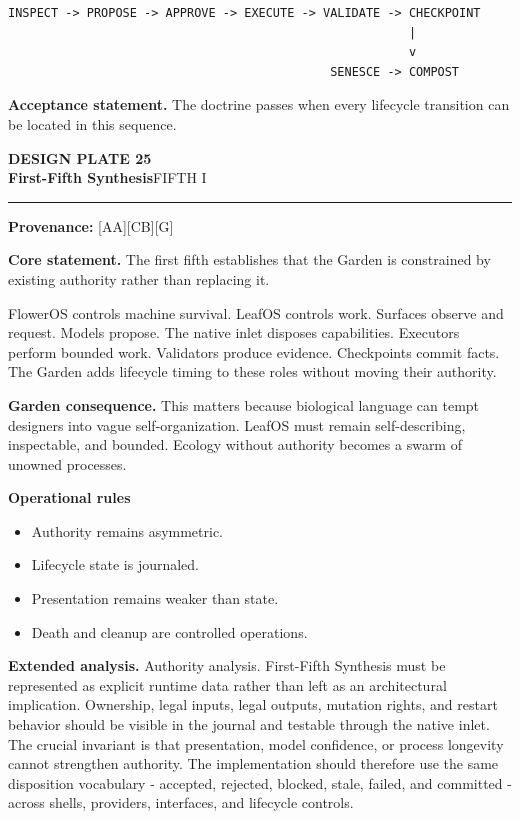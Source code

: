\documentclass[10pt,letterpaper,oneside]{article}
\newcommand{\prov}[1]{\textcolor{gardenBlue}{\sffamily\footnotesize\textbf{Provenance:} #1}}
\newcommand{\platetitle}[3]{%
  \begin{minipage}[t][0.54in][t]{\textwidth}
  {\sffamily\bfseries\color{gardenDeep}\fontsize{9}{10}\selectfont DESIGN PLATE #1}\\[-1pt]
  {\sffamily\bfseries\color{gardenInk}\fontsize{16.5}{18}\selectfont #2}\hfill{\sffamily\color{gardenGreen}\large #3}
  \end{minipage}\vspace{-2pt}\hrule\vspace{5pt}}
\begin{document}
\begin{lstlisting}
INSPECT -> PROPOSE -> APPROVE -> EXECUTE -> VALIDATE -> CHECKPOINT
                                                        |
                                                        v
                                             SENESCE -> COMPOST
\end{lstlisting}
\begin{acceptbox}
\textbf{Acceptance statement.} The doctrine passes when every lifecycle transition can be located in this sequence.
\end{acceptbox}
\newpage
\platetitle{25}{First-Fifth Synthesis}{FIFTH I}
\prov{[AA][CB][G]}
\fontsize{8.85}{10.45}\selectfont
\begin{corebox}
\textbf{Core statement.} The first fifth establishes that the Garden is constrained by existing authority rather than replacing it.
\end{corebox}
FlowerOS controls machine survival. LeafOS controls work. Surfaces observe and request. Models propose. The native inlet disposes capabilities. Executors perform bounded work. Validators produce evidence. Checkpoints commit facts. The Garden adds lifecycle timing to these roles without moving their authority.

\textbf{Garden consequence.} This matters because biological language can tempt designers into vague self-organization. LeafOS must remain self-describing, inspectable, and bounded. Ecology without authority becomes a swarm of unowned processes.

\textbf{Operational rules}
\begin{itemize}
\item Authority remains asymmetric.
\item Lifecycle state is journaled.
\item Presentation remains weaker than state.
\item Death and cleanup are controlled operations.
\end{itemize}
\textbf{Extended analysis.} Authority analysis. First-Fifth Synthesis must be represented as explicit runtime data rather than left as an architectural implication. Ownership, legal inputs, legal outputs, mutation rights, and restart behavior should be visible in the journal and testable through the native inlet. The crucial invariant is that presentation, model confidence, or process longevity cannot strengthen authority. The implementation should therefore use the same disposition vocabulary - accepted, rejected, blocked, stale, failed, and committed - across shells, providers, interfaces, and lifecycle controls.
\end{document}
